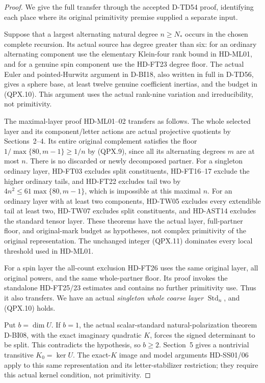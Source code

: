 \begin{proof}
We give the full transfer through the accepted D-TD54
proof, identifying each place where its original
primitivity premise supplied a separate input.

Suppose that a largest alternating natural degree
\(n\ge N_*\) occurs in the chosen complete recursion.
Its actual source has degree greater than six: for an
ordinary alternating component use the elementary
Klein-four rank bound in HD-ML01, and for a genuine
spin component use the HD-FT23 degree floor.
The actual Euler and pointed-Hurwitz argument in D-BI18,
also written in full in D-TD56, gives a sphere base,
at least twelve genuine coefficient inertias, and the
budget in (QPX.10). This argument uses the actual
rank-nine variation and irreducibility, not primitivity.

The maximal-layer proof HD-ML01--02 transfers as follows.
The whole selected layer and its component/letter actions
are actual projective quotients by Sections~2--4.
Its entire original complement satisfies the floor
\(1/\max\{80,m-1\}\ge1/n\) by (QPX.9), since all its
alternating degrees \(m\) are at most \(n\).
There is no discarded or newly decomposed partner.
For a singleton ordinary layer, HD-FT03 excludes split
constituents, HD-FT16--17 exclude the higher ordinary
tails, and HD-FT22 excludes tail two by
\(4n^2\le61\max\{80,m-1\}\), which is impossible at
this maximal \(n\). For an ordinary layer with at
least two components, HD-TW05 excludes every extendible
tail at least two, HD-TW07 excludes split constituents,
and HD-AST14 excludes the standard tensor layer.
These theorems have the actual layer, full-partner floor,
and original-mark budget as hypotheses, not complex
primitivity of the original representation.
The unchanged integer (QPX.11) dominates every local
threshold used in HD-ML01.

For a spin layer the all-count exclusion HD-FT26 uses
the same original layer, all original powers, and the
same whole-partner floor. Its proof invokes the
standalone HD-FT25/23 estimates and contains no further
primitivity use. Thus it also transfers. We have an
actual \emph{singleton whole coarse layer}
\(\operatorname{Std}_n\), and (QPX.10) holds.

Put \(b=\dim U\). If \(b=1\), the actual scalar-standard
natural-polarization theorem D-BI08, with the exact
imaginary quadratic \(K\), forces the signed determinant
to be split. This contradicts the hypothesis, so \(b\ge2\).
Section~5 gives a nontrivial transitive \(K_0=\ker U\).
The exact-\(K\) image and model arguments HD-SS01/06
apply to this same representation and its letter-stabilizer
restriction; they require this actual kernel condition,
not primitivity.


\end{proof}
